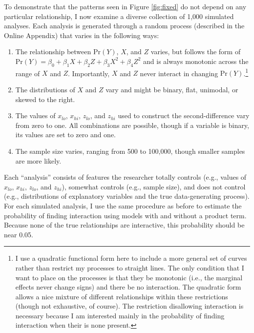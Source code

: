 \documentclass[12pt]{article}
\begin{document}
To demonstrate that the patterns seen in Figure \ref{fig:fixed} do not depend on any particular relationship, I now examine a diverse collection of 1,000 simulated analyses. Each analysis is generated through a random process (described in the Online Appendix) that varies in the following ways:\singlespace\vspace{-3mm}
\begin{enumerate}
\item The relationship between $\text{Pr}(Y)$, $X$, and $Z$ varies, but follows the form of $\text{Pr}(Y) = \beta_0 + \beta_1X + \beta_2Z + \beta_3X^2 + \beta_4Z^2$ and is always monotonic across the range of $X$ and $Z$. Importantly, $X$ and $Z$ never interact in changing $\text{Pr}(Y)$.\footnote{I use a quadratic functional form here to include a more general set of curves rather than restrict my processes to straight lines. The only condition that I want to place on the processes is that they be monotonic (i.e., the marginal effects never change signs) and there be no interaction. The quadratic form allows a nice mixture of different relationships within these restrictions (though not exhaustive, of course). The restriction disallowing interaction is necessary because I am interested mainly in the probability of finding interaction when their is none present.}
\item The distributions of $X$ and $Z$ vary and might be binary, flat, unimodal, or  skewed to the right.
\item The values of $x_{lo}$, $x_{hi}$, $z_{lo}$, and $z_{hi}$ used to construct the second-difference vary from zero to one. All combinations are possible, though if a variable is binary, its values are set to zero and one.
\item The sample size varies, ranging from 500 to 100,000, though smaller samples are more likely.


\end{enumerate}
\doublespace
Each ``analysis'' consists of features the researcher totally controls (e.g., values of $x_{lo}$, $x_{hi}$, $z_{lo}$, and $z_{hi}$), somewhat controls (e.g., sample size), and does not control (e.g., distributions of explanatory variables and the true data-generating process). For each simulated analysis, I use the same procedure as before to estimate the probability of finding interaction using models with and without a product term. Because none of the true relationships are interactive, this probability should be near 0.05. 
\end{document}
